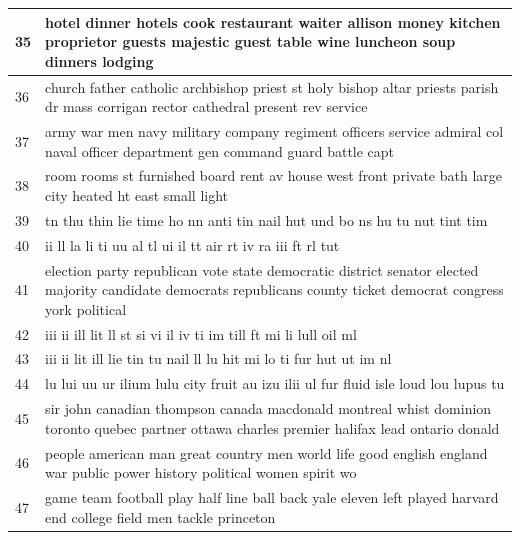 \documentclass[letterpaper,11pt]{report}
\begin{document}
\begin{longtable}[c]{| p{1cm} | p{16cm} |}
35 & hotel dinner hotels cook restaurant waiter allison money kitchen proprietor guests majestic guest table wine luncheon soup dinners lodging                       \\ \hline
36 & church father catholic archbishop priest st holy bishop altar priests parish dr mass corrigan rector cathedral present rev service                               \\ \hline
37 & army war men navy military company regiment officers service admiral col naval officer department gen command guard battle capt                                  \\ \hline
38 & room rooms st furnished board rent av house west front private bath large city heated ht east small light                                                        \\ \hline
39 & tn thu thin lie time ho nn anti tin nail hut und bo ns hu tu nut tint tim                                                                                        \\ \hline
40 & ii ll la li ti uu al tl ui il tt air rt iv ra iii ft rl tut                                                                                                      \\ \hline
41 & election party republican vote state democratic district senator elected majority candidate democrats republicans county ticket democrat congress york political \\ \hline
42 & iii ii ill lit ll st si vi il iv ti im till ft mi li lull oil ml                                                                                                 \\ \hline
43 & iii ii lit ill lie tin tu nail ll lu hit mi lo ti fur hut ut im nl                                                                                               \\ \hline
44 & lu lui uu ur ilium lulu city fruit au izu ilii ul fur fluid isle loud lou lupus tu                                                                               \\ \hline
45 & sir john canadian thompson canada macdonald montreal whist dominion toronto quebec partner ottawa charles premier halifax lead ontario donald                    \\ \hline
46 & people american man great country men world life good english england war public power history political women spirit wo                                         \\ \hline
47 & game team football play half line ball back yale eleven left played harvard end college field men tackle princeton                                               \\ \hline

\end{longtable}
\end{document}
